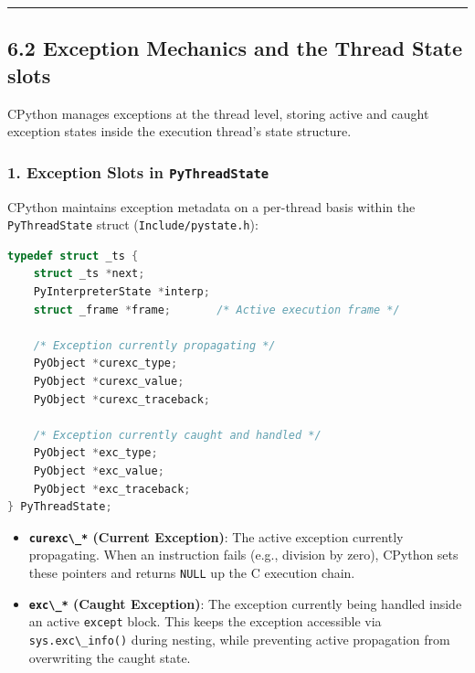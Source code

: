 \begin{center}\rule{0.5\linewidth}{0.5pt}\end{center}

\hypertarget{exception-mechanics-and-the-thread-state-slots}{%
\subsection{6.2 Exception Mechanics and the Thread State
slots}\label{exception-mechanics-and-the-thread-state-slots}}

CPython manages exceptions at the thread level, storing active and
caught exception states inside the execution thread's state structure.

\hypertarget{exception-slots-in-pythreadstate}{%
\subsubsection{\texorpdfstring{1. Exception Slots in
\texttt{PyThreadState}}{1. Exception Slots in PyThreadState}}\label{exception-slots-in-pythreadstate}}

CPython maintains exception metadata on a per-thread basis within the
\passthrough{\lstinline!PyThreadState!} struct
(\passthrough{\lstinline!Include/pystate.h!}):

\begin{lstlisting}[language=C]
typedef struct _ts {
    struct _ts *next;
    PyInterpreterState *interp;
    struct _frame *frame;       /* Active execution frame */
    
    /* Exception currently propagating */
    PyObject *curexc_type;
    PyObject *curexc_value;
    PyObject *curexc_traceback;

    /* Exception currently caught and handled */
    PyObject *exc_type;
    PyObject *exc_value;
    PyObject *exc_traceback;
} PyThreadState;
\end{lstlisting}

\begin{itemize}
\tightlist
\item
  \textbf{\passthrough{\lstinline!curexc\_*!} (Current Exception)}: The
  active exception currently propagating. When an instruction fails
  (e.g., division by zero), CPython sets these pointers and returns
  \passthrough{\lstinline!NULL!} up the C execution chain.
\item
  \textbf{\passthrough{\lstinline!exc\_*!} (Caught Exception)}: The
  exception currently being handled inside an active
  \passthrough{\lstinline!except!} block. This keeps the exception
  accessible via \passthrough{\lstinline!sys.exc\_info()!} during
  nesting, while preventing active propagation from overwriting the
  caught state.
\end{itemize}

